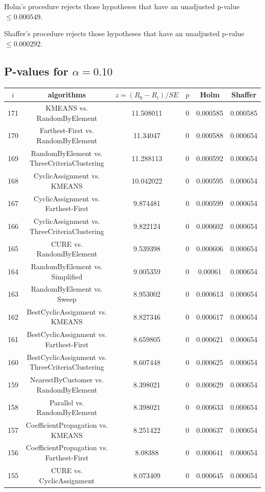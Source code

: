 \documentclass[a4paper,10pt]{article}
\begin{document}
\begin{landscape}
Holm's procedure rejects those hypotheses that have an unadjusted p-value $\le0.000549$.

Shaffer's procedure rejects those hypotheses that have an unadjusted p-value $\le0.000292$.

\pagebreak

\subsection{P-values for $\alpha=0.10$}

\begin{table}[!htp]
\centering\scriptsize
\begin{tabular}{cccccc}
$i$&algorithms&$z=(R_0 - R_i)/SE$&$p$&Holm&Shaffer\\
\hline171&KMEANS vs. RandomByElement&11.508011&0&0.000585&0.000585\\
170&Farthest-First vs. RandomByElement&11.34047&0&0.000588&0.000654\\
169&RandomByElement vs. ThreeCriteriaClustering&11.288113&0&0.000592&0.000654\\
168&CyclicAssignment vs. KMEANS&10.042022&0&0.000595&0.000654\\
167&CyclicAssignment vs. Farthest-First&9.874481&0&0.000599&0.000654\\
166&CyclicAssignment vs. ThreeCriteriaClustering&9.822124&0&0.000602&0.000654\\
165&CURE vs. RandomByElement&9.539398&0&0.000606&0.000654\\
164&RandomByElement vs. Simplified&9.005359&0&0.00061&0.000654\\
163&RandomByElement vs. Sweep&8.953002&0&0.000613&0.000654\\
162&BestCyclicAssignment vs. KMEANS&8.827346&0&0.000617&0.000654\\
161&BestCyclicAssignment vs. Farthest-First&8.659805&0&0.000621&0.000654\\
160&BestCyclicAssignment vs. ThreeCriteriaClustering&8.607448&0&0.000625&0.000654\\
159&NearestByCustomer vs. RandomByElement&8.398021&0&0.000629&0.000654\\
158&Parallel vs. RandomByElement&8.398021&0&0.000633&0.000654\\
157&CoefficientPropagation vs. KMEANS&8.251422&0&0.000637&0.000654\\
156&CoefficientPropagation vs. Farthest-First&8.08388&0&0.000641&0.000654\\
155&CURE vs. CyclicAssignment&8.073409&0&0.000645&0.000654\\

\end{tabular}
\end{table}
\end{landscape}
\end{document}
